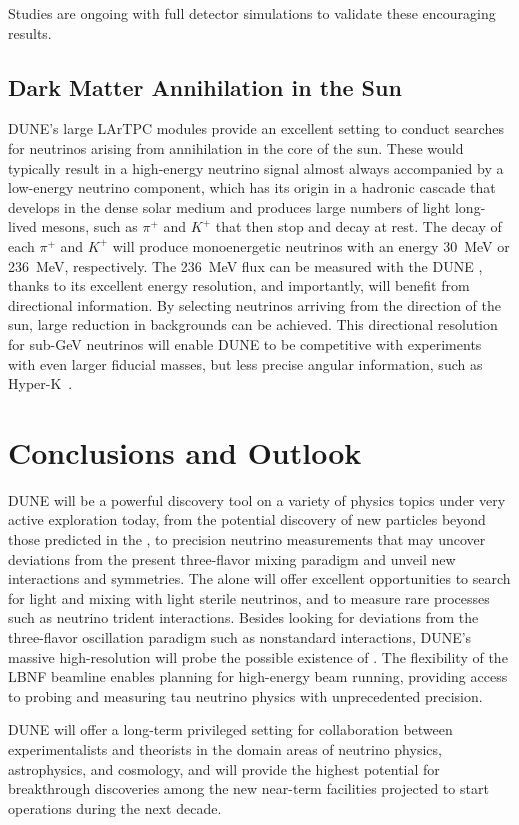 Studies are ongoing with full detector simulations to validate these 
encouraging results.


\subsection{Dark Matter Annihilation in the Sun}
DUNE's large  LArTPC modules provide an excellent setting to conduct searches for neutrinos arising from  annihilation in the core of the sun. These would typically result in a high-energy neutrino signal almost always accompanied by a low-energy neutrino component, which has its origin in a hadronic cascade that develops in the dense solar medium and produces large numbers of light long-lived mesons, such as $\pi^+$ and $K^+$ that
then stop and decay at rest. The decay of each $\pi^+$ and $K^+$ will produce monoenergetic neutrinos with an energy \SI{30}{MeV} or \SI{236}{MeV}, respectively.
The  \SI{236}{MeV} flux can be measured with the DUNE , thanks to its excellent energy resolution, and importantly, will benefit from directional information. By selecting neutrinos arriving from the direction of the sun, large reduction in backgrounds can be achieved.
This directional resolution for sub-GeV neutrinos will enable DUNE to be competitive with experiments with even larger fiducial masses, but less precise angular information, such as Hyper-K~\cite{ref:DMannihilation}.

\section{Conclusions and Outlook}
DUNE will be a powerful discovery tool on a variety of physics topics under very active exploration today, from the potential discovery of new particles beyond those predicted in the , to precision neutrino measurements that may uncover deviations from the present three-flavor mixing paradigm and unveil new interactions and symmetries.
The  alone will offer excellent opportunities to search for light  and mixing with light sterile neutrinos, and to measure rare processes such as neutrino trident interactions. Besides looking for deviations from the three-flavor oscillation paradigm such as nonstandard interactions, DUNE's massive high-resolution  will probe the possible existence of . The flexibility of the LBNF beamline enables planning for high-energy beam running, providing access to probing and measuring tau neutrino physics with unprecedented precision.

DUNE will offer a long-term privileged setting for collaboration between experimentalists and theorists in the domain areas of neutrino physics, astrophysics, and cosmology, and will provide the highest potential for breakthrough discoveries among the new near-term facilities projected to start operations during the next decade.
